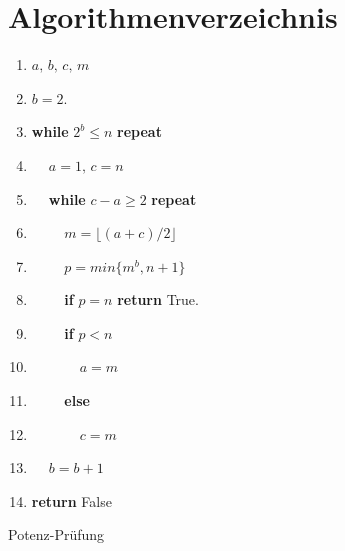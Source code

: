 \documentclass[12pt,oneside]{article}
\theoremstyle{remark}
\theoremstyle{definition}
\begin{document}
\section{Algorithmenverzeichnis}
\begin{algorithm}[H]
\SetAlgoLined
{}
\begin{enumerate}
\item $a, \, b, \, c, \, m$

\item $ b = 2$.

\item \textbf{while} $2^b \leq n$ \textbf{repeat}

\item $\: \: \: \: $ $a = 1, \, c = n $

\item $\: \: \: \: $ \textbf{while} $c - a \geq 2$ \textbf{repeat}

\item $\: \: \: \: \: \: \: \: \:$ $ m = \lfloor (a + c)/2 \rfloor$

\item $\: \: \: \: \: \: \: \: \:$ $ p = min\{m^b,n+1\}$

\item $\: \: \: \: \: \: \: \: \:$ \textbf{if} $ p = n$ \textbf{return} True.

\item $\: \: \: \: \: \: \: \: \:$ \textbf{if} $p < n$

\item $\: \: \: \: \: \: \: \: \: \: \: \: \: \:$  $ a = m$

\item $\: \: \: \: \: \: \: \: \:$ \textbf{else}

\item $\: \: \: \: \: \: \: \: \: \: \: \: \: \:$  $c = m$

\item $\: \: \: \: $ $b = b + 1$

\item \textbf{return} False


\end{enumerate}
\caption{Potenz-Prüfung}
\label{appendix:potenz}
\end{algorithm}
\end{document}
